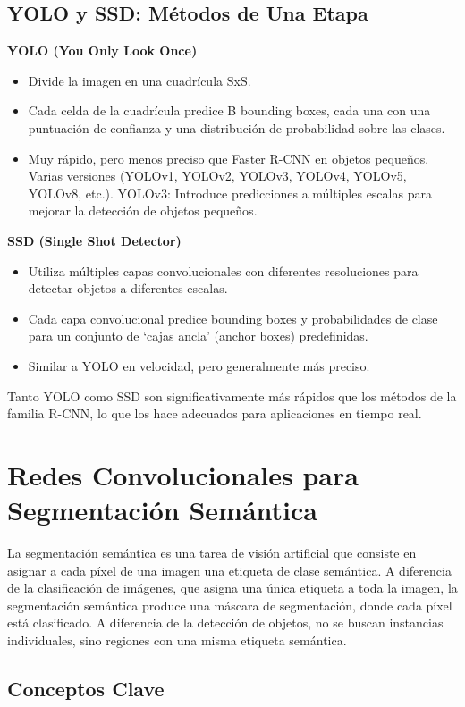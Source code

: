 \documentclass{article}
\begin{document}
\subsection{YOLO y SSD: Métodos de Una Etapa}
\textbf{YOLO (You Only Look Once)}
\begin{itemize}
   \item Divide la imagen en una cuadrícula SxS.
   \item Cada celda de la cuadrícula predice B bounding boxes, cada una con una puntuación de confianza y una distribución de probabilidad sobre las clases.
   \item Muy rápido, pero menos preciso que Faster R-CNN en objetos pequeños. Varias versiones (YOLOv1, YOLOv2, YOLOv3, YOLOv4, YOLOv5, YOLOv8, etc.).
      YOLOv3: Introduce predicciones a múltiples escalas para mejorar la detección de objetos pequeños.
\end{itemize}

\textbf{SSD (Single Shot Detector)}
\begin{itemize}
    \item Utiliza múltiples capas convolucionales con diferentes resoluciones para detectar objetos a diferentes escalas.
    \item Cada capa convolucional predice bounding boxes y probabilidades de clase para un conjunto de `cajas ancla' (anchor boxes) predefinidas.
    \item Similar a YOLO en velocidad, pero generalmente más preciso.
\end{itemize}
Tanto YOLO como SSD son significativamente más rápidos que los métodos de la familia R-CNN, lo que los hace adecuados para aplicaciones en tiempo real.

\section{Redes Convolucionales para Segmentación Semántica}

La segmentación semántica es una tarea de visión artificial que consiste en asignar a cada píxel de una imagen una etiqueta de clase semántica. A diferencia de la clasificación de imágenes, que asigna una única etiqueta a toda la imagen, la segmentación semántica produce una máscara de segmentación, donde cada píxel está clasificado.  A diferencia de la detección de objetos, no se buscan instancias individuales, sino regiones con una misma etiqueta semántica.

\subsection{Conceptos Clave}
\end{document}
